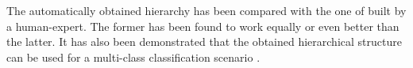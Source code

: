 The automatically obtained hierarchy has been compared with the one of built by a human-expert. The former has been found to work equally or even better than the latter. It has also been demonstrated that the obtained hierarchical structure can be used for a multi-class classification scenario \parencite{malinen2014balanced}. 







